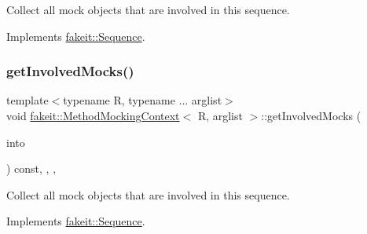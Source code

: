 Collect all mock objects that are involved in this sequence. 



Implements \mbox{\hyperlink{classfakeit_1_1Sequence_a4af96a0de0fa659fe826431e4d61757a}{fakeit\+::\+Sequence}}.

\mbox{\label{classfakeit_1_1MethodMockingContext_ac66ba7b51a3c845b8fe8f2fa0f5f5ff0}} 
\subsubsection{\texorpdfstring{getInvolvedMocks()}{getInvolvedMocks()}\hspace{0.1cm}{\footnotesize\ttfamily [7/9]}}
{\footnotesize\ttfamily template$<$typename R, typename ... arglist$>$ \\
void \mbox{\hyperlink{classfakeit_1_1MethodMockingContext}{fakeit\+::\+Method\+Mocking\+Context}}$<$ R, arglist $>$\+::get\+Involved\+Mocks (\begin{DoxyParamCaption}\item[{std\+::vector$<$ \mbox{\hyperlink{structfakeit_1_1ActualInvocationsSource}{Actual\+Invocations\+Source}} $\ast$ $>$ \&}]{into }\end{DoxyParamCaption}) const\hspace{0.3cm}{\ttfamily [inline]}, {\ttfamily [override]}, {\ttfamily [protected]}, {\ttfamily [virtual]}}



Collect all mock objects that are involved in this sequence. 



Implements \mbox{\hyperlink{classfakeit_1_1Sequence_a4af96a0de0fa659fe826431e4d61757a}{fakeit\+::\+Sequence}}.

\mbox{\label{classfakeit_1_1MethodMockingContext_ac66ba7b51a3c845b8fe8f2fa0f5f5ff0}} 
